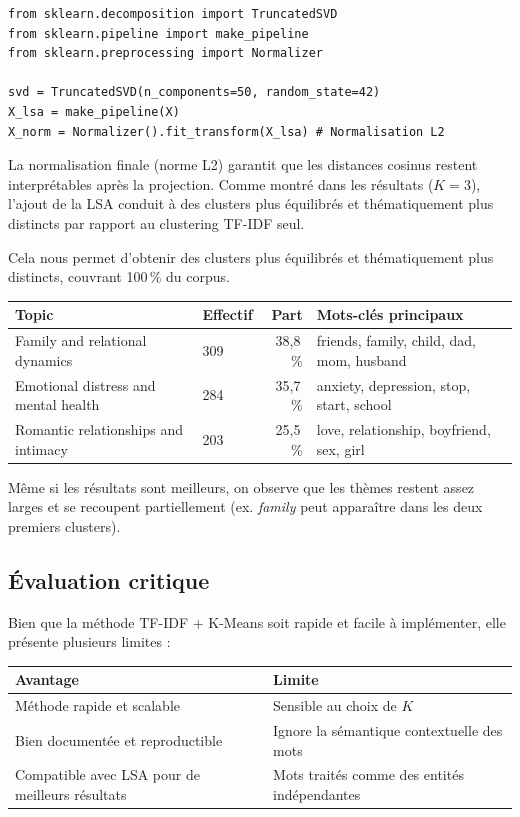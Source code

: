 \documentclass[12pt,a4paper]{report}
\begin{document}
\begin{lstlisting}
from sklearn.decomposition import TruncatedSVD
from sklearn.pipeline import make_pipeline
from sklearn.preprocessing import Normalizer

svd = TruncatedSVD(n_components=50, random_state=42)
X_lsa = make_pipeline(X)
X_norm = Normalizer().fit_transform(X_lsa) # Normalisation L2
\end{lstlisting}

La normalisation finale (norme L2) garantit que les distances cosinus restent interprétables
après la projection. Comme montré dans les résultats ($K = 3$), l'ajout de la LSA conduit à
des clusters plus équilibrés et thématiquement plus distincts par rapport au clustering TF-IDF seul.

Cela nous permet d'obtenir des clusters plus équilibrés et thématiquement plus distincts, couvrant 100\,\% du corpus.

\begin{center}
\begin{tabular}{@{}L{5cm}lrL{4cm}@{}}
\toprule
\textbf{Topic} & \textbf{Effectif} & \textbf{Part} & \textbf{Mots-clés principaux} \\
\midrule
Family and relational dynamics            & 309 & 38,8\,\% & friends, family, child, dad, mom, husband \\
Emotional distress and mental health      & 284 & 35,7\,\% & anxiety, depression, stop, start, school \\
Romantic relationships and intimacy       & 203 & 25,5\,\% & love, relationship, boyfriend, sex, girl \\
\bottomrule
\end{tabular}
\end{center}

Même si les résultats sont meilleurs, on observe que les thèmes restent assez larges et se recoupent partiellement (ex. \textit{family} peut apparaître dans les deux premiers clusters).

\subsection{Évaluation critique}

Bien que la méthode TF-IDF + K-Means soit rapide et facile à implémenter, elle présente plusieurs limites :

\begin{center}
\begin{tabular}{@{}L{7.5cm}L{7.5cm}@{}}
\toprule
\textbf{Avantage} & \textbf{Limite} \\
\midrule
Méthode rapide et scalable & Sensible au choix de $K$ \\
Bien documentée et reproductible & Ignore la sémantique contextuelle des mots \\
Compatible avec LSA pour de meilleurs résultats & Mots traités comme des entités indépendantes \\
\bottomrule
\end{tabular}
\end{center}
\end{document}
